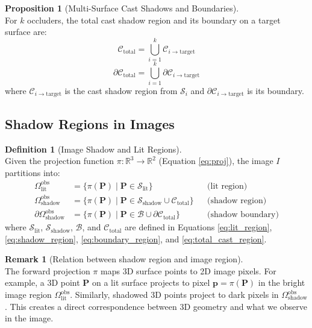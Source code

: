 \documentclass[12pt]{article}
\newcommand{\R}{\mathbb{R}}
\newcommand{\vect}[1]{\bm{#1}}
\theoremstyle{definition}
\newtheorem{definition}{Definition}[subsection]
\newtheorem{proposition}{Proposition}[subsection]
\newtheorem{remark}{Remark}[subsection]
\begin{document}
\begin{proposition}[Multi-Surface Cast Shadows and Boundaries] ~\\
For $k$ occluders, the total cast shadow region and its boundary on a target surface are:
\begin{equation}
\boxed{\mathcal{C}_{\text{total}} = \bigcup_{i=1}^k \mathcal{C}_{i \to \text{target}} \label{eq:total_cast_region}}
\end{equation}
\begin{equation}
\boxed{\partial\mathcal{C}_{\text{total}} = \bigcup_{i=1}^k \partial\mathcal{C}_{i \to \text{target}} \label{eq:total_cast_boundary}}
\end{equation}
where $\mathcal{C}_{i \to \text{target}}$ is the cast shadow region from $\mathcal{S}_i$ and $\partial\mathcal{C}_{i \to \text{target}}$ is its boundary.
\end{proposition}

\subsection{Shadow Regions in Images}

\begin{definition}[Image Shadow and Lit Regions] ~\\
Given the projection function $\pi: \R^3 \to \R^2$ (Equation \eqref{eq:proj}), the image $I$ partitions into:
\begin{align}
\Omega_{\text{lit}}^{\text{obs}} &= \{\pi(\vect{P}) \mid \vect{P} \in \mathcal{S}_{\text{lit}}\} && \text{(lit region)} \label{eq:image_lit} \\
\Omega_{\text{shadow}}^{\text{obs}} &= \{\pi(\vect{P}) \mid \vect{P} \in \mathcal{S}_{\text{shadow}} \cup \mathcal{C}_{\text{total}}\} && \text{(shadow region)} \label{eq:image_shadow} \\
\partial\Omega_{\text{shadow}}^{\text{obs}} &= \{\pi(\vect{P}) \mid \vect{P} \in \mathcal{B} \cup \partial\mathcal{C}_{\text{total}}\} && \text{(shadow boundary)} \label{eq:image_boundary}
\end{align}
where $\mathcal{S}_{\text{lit}}$, $\mathcal{S}_{\text{shadow}}$, $\mathcal{B}$, and $\mathcal{C}_{\text{total}}$ are defined in Equations \eqref{eq:lit_region}, \eqref{eq:shadow_region}, \eqref{eq:boundary_region}, and \eqref{eq:total_cast_region}.
\end{definition}

\newpage

\begin{remark}[Relation between shadow region and image region] ~\\
The forward projection $\pi$ maps 3D surface points to 2D image pixels. For example, a 3D point $\vect{P}$ on a lit surface projects to pixel $\vect{p} = \pi(\vect{P})$ in the bright image region $\Omega_{\text{lit}}^{\text{obs}}$. Similarly, shadowed 3D points project to dark pixels in $\Omega_{\text{shadow}}^{\text{obs}}$. This creates a direct correspondence between 3D geometry and what we observe in the image.
\end{remark}
\end{document}
